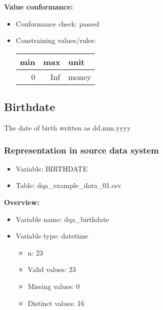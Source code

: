 \documentclass[
]{article}
\providecommand{\tightlist}{%
  \setlength{\itemsep}{0pt}\setlength{\parskip}{0pt}}
\begin{document}
\textbf{Value conformance:}

\begin{itemize}
\tightlist
\item
  Conformance check: passed
\item
  Constraining values/rules:

  \begin{table}[H]
  \centering
  \begin{tabular}{r|r|l}
  \hline
  \textbf{min} & \textbf{max} & \textbf{unit}\\
  \hline
  0 & Inf & money\\
  \hline
  \end{tabular}
  \end{table}
\end{itemize}

\newpage

\hypertarget{birthdate}{%
\subsection{Birthdate}\label{birthdate}}

The date of birth written as dd.mm.yyyy

\hypertarget{representation-in-source-data-system-2}{%
\subsubsection{\texorpdfstring{Representation in \textbf{source} data
system}{Representation in source data system}}\label{representation-in-source-data-system-2}}

\begin{itemize}
\tightlist
\item
  Variable: BIRTHDATE
\item
  Table: dqa\_example\_data\_01.csv
\end{itemize}

\textbf{Overview:}

\begin{itemize}
\tightlist
\item
  Variable name: dqa\_birthdate
\item
  Variable type: datetime

  \begin{itemize}
  \tightlist
  \item
    n: 23
  \item
    Valid values: 23
  \item
    Missing values: 0
  \item
    Distinct values: 16
  \end{itemize}
\end{itemize}
\end{document}
